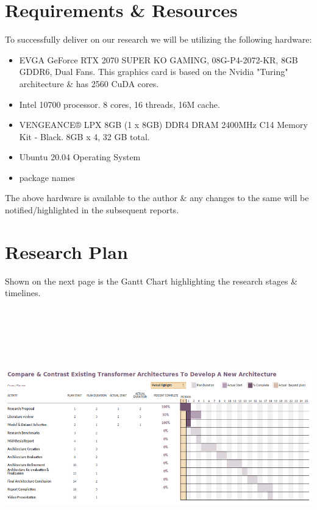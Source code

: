 \documentclass[11pt]{article}
\begin{document}
\section{Requirements \& Resources}\label{resources}

To successfully deliver on our research we will be utilizing the following hardware:
\begin{itemize}
    \item EVGA GeForce RTX 2070 SUPER KO GAMING, 08G-P4-2072-KR, 8GB GDDR6, Dual Fans\citet{2070}. This graphics card is based on the Nvidia "Turing" architecture \& has 2560 CuDA cores.
    \item Intel 10700 processor. 8 cores, 16 threads, 16M cache\citet{intel}.
    \item VENGEANCE® LPX 8GB (1 x 8GB) DDR4 DRAM 2400MHz C14 Memory Kit - Black\citet{ram}. 8GB x 4, 32 GB total.
    \item Ubuntu 20.04 Operating System
    \item package names
\end{itemize}

The above hardware is available to the author \& any changes to the same will be notified/highlighted in the subsequent reports.
\section{Research Plan}\label{plan}

Shown on the next page is the Gantt Chart highlighting the research stages \& timelines.\\
\includegraphics[width=180mm,height=120mm,angle=90]{g2.png}
\newpage


\end{document}
